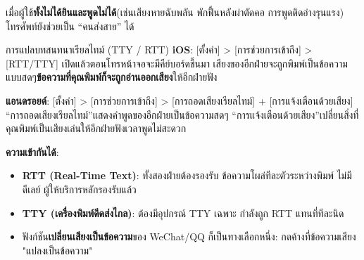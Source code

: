 
เมื่อผู้ใช้\textbf{ทั้งไม่ได้ยินและพูดไม่ได้}(เช่นเสียงหายฉับพลัน พักฟื้นหลังผ่าตัดคอ การพูดติดอ่างรุนแรง) โทรศัพท์ยังช่วยเป็น “คนส่งสาย” ได้

\begin{tcbinfo}{การแปลบทสนทนาเรียลไทม์ (TTY / RTT)}
\textbf{iOS}: [ตั้งค่า] > [การช่วยการเข้าถึง] > [RTT/TTY] เปิดแล้วตอนโทรหน้าจอจะมีคีย์บอร์ดขึ้นมา เสียงของอีกฝ่ายจะถูกพิมพ์เป็นข้อความแบบสดๆ\textbf{ข้อความที่คุณพิมพ์ก็จะถูกอ่านออกเสียง}ให้อีกฝ่ายฟัง

\textbf{แอนดรอยด์}: [ตั้งค่า] > [การช่วยการเข้าถึง] > [การถอดเสียงเรียลไทม์] + [การแจ้งเตือนด้วยเสียง] “การถอดเสียงเรียลไทม์”แสดงคำพูดของอีกฝ่ายเป็นข้อความสดๆ “การแจ้งเตือนด้วยเสียง”เปลี่ยนสิ่งที่คุณพิมพ์เป็นเสียงเล่นให้อีกฝ่ายฟังเวลาพูดไม่สะดวก

\textbf{ความเข้ากันได้}:

\begin{itemize}
  \item \textbf{RTT (Real-Time Text)}: ทั้งสองฝ่ายต้องรองรับ ข้อความโผล่ทีละตัวระหว่างพิมพ์ ไม่มีดีเลย์ ผู้ให้บริการหลักรองรับแล้ว
  \item \textbf{TTY (เครื่องพิมพ์ดีดส่งไกล)}: ต้องมีอุปกรณ์ TTY เฉพาะ กำลังถูก RTT แทนที่ทีละนิด
  \item ฟังก์ชัน\textbf{เปลี่ยนเสียงเป็นข้อความ}ของ WeChat/QQ ก็เป็นทางเลือกหนึ่ง: กดค้างที่ข้อความเสียง "แปลงเป็นข้อความ"
\end{itemize}

\end{tcbinfo}


